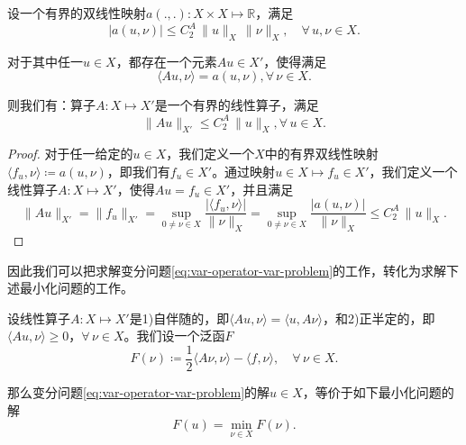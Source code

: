 \begin{lemma}
  \label{lemma:var-bilinear-form-to-A}
  设一个有界的双线性映射$a(.,.): X \times X \mapsto \mathbb{R}$，满足
  \begin{equation*}
    \big| a(u,\nu) \big| \le C_2^A \, \big\| u \big\|_{X} \, \big\| \nu \big\|_{X}, \quad \forall \, u,\nu \in X.
  \end{equation*}

    对于其中任一$u \in X$，都存在一个元素$A u \in X'$，使得满足
    \begin{equation*}
      \langle Au, \nu \rangle = a(u,\nu), \forall \, \nu \in X.
    \end{equation*}

    则我们有：算子$A:X \mapsto X'$是一个有界的线性算子，满足
    \begin{equation*}
      \big\| A u \big\|_{X'} \le C_2^A \, \big\| u \big\|_{X}, \forall \, u \in X.
    \end{equation*}
\end{lemma}
\begin{proof}
  对于任一给定的$u \in X$，我们定义一个$X$中的有界双线性映射$\langle f_u, \nu \rangle \coloneqq a(u,\nu)$，即我们有$f_u \in X'$。通过映射$u \in X \mapsto f_u \in X'$，我们定义一个线性算子$A: X \mapsto X'$，使得$A u = f_u \in X'$，并且满足
  \begin{equation*}
    \big\| Au \big\|_{X'} = \big\| f_u \big\|_{X'}
    = \sup_{ 0 \neq \nu \in X}
    \frac{
      \big| \langle f_u,\nu \rangle \big|
    }{
    \big\| \nu \big\|_{X}
    }
    = \sup_{ 0 \neq \nu \in X}
    \frac{
      \big| a(u,\nu) \big|
    }{
    \big\| \nu \big\|_{X}
    }
    \le C_2^A \, \big\| u \big\|_{X}.
  \end{equation*}
\end{proof}

因此我们可以把求解变分问题\eqref{eq:var-operator-var-problem}的工作，转化为求解下述最小化问题的工作。
\begin{lemma}
  \label{lemma:var-minimization-problem}
  设线性算子$A:X \mapsto X'$是1)自伴随的，即$\langle A u ,\nu \rangle = \langle u, A \nu \rangle$，和2)正半定的，即$\langle A u, \nu \rangle \ge 0$，$\forall \, \nu \in X$。我们设一个泛函$F$
  \begin{equation}
    \label{eq:var-mini-functional-F}
    F(\nu) \coloneqq \frac{1}{2} \langle A\nu, \nu \rangle - \langle f, \nu \rangle, \quad \forall \, \nu \in X.
  \end{equation}

那么变分问题\eqref{eq:var-operator-var-problem}的解$u \in X$，等价于如下最小化问题的解
\begin{equation}
  \label{eq:var-operator-min-problem}
  F(u) = \min_{\nu \in X} F(\nu).
\end{equation}
\end{lemma}

